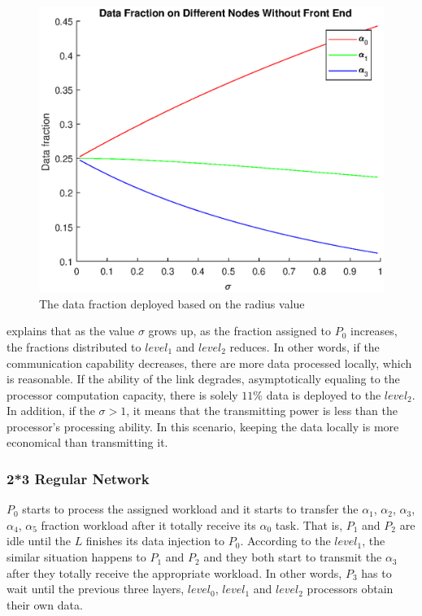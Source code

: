 \begin{figure}[!ht]
\centering
\includegraphics[width=1\columnwidth]{figure/2t2_no_fraction.eps}
\caption{The data fraction deployed based on the radius value }
\label{fig:2t2_no_fraction}
\end{figure}
\newpage

 explains that as the value $\sigma$ grows up,  as the fraction assigned to $P_{0}$ increases, the fractions distributed to $level_{1}$ and $level_{2}$ reduces.  In other words, if the communication capability decreases, there are more data processed locally, which is reasonable.  If the ability of the link degrades, asymptotically equaling to the processor computation capacity, there is solely $11\%$ data is deployed to the $level_{2}$.  In addition, if the $\sigma > 1$,  it means that the transmitting power is less than the processor's processing ability.  In this scenario, keeping the data locally is more economical than transmitting it.  
\newpage

\subsubsection*{2*3 Regular Network}

$P_{0}$ starts to process the assigned workload and it starts to transfer the $\alpha_{1}$, $\alpha_{2}$, $\alpha_{3}$, $\alpha_{4}$, $\alpha_{5}$ fraction workload after it totally receive its $\alpha_{0}$ task.  That is,  $P_{1}$ and $P_{2}$ are idle until the $L$ finishes its data injection to $P_{0}$.  According to the $level_{1}$, the similar situation happens to $P_{1}$ and $P_{2}$ and they both start to transmit the $\alpha_{3}$ after they totally receive the appropriate workload.  In other words, $P_{3}$ has to wait until the previous three layers,  $level_{0}$,  $level_{1}$ and $level_{2}$ processors obtain their own data.  

